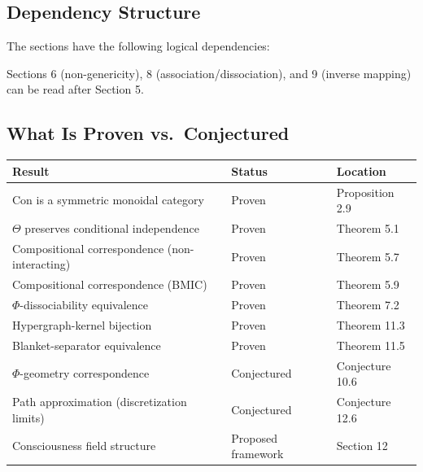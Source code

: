 \documentclass[11pt,a4paper]{article}
\theoremstyle{definition}
\theoremstyle{plain}
\theoremstyle{remark}
\begin{document}
\subsection*{Dependency Structure}

The sections have the following logical dependencies:
\begin{center}
\end{center}

Sections 6 (non-genericity), 8 (association/dissociation), and 9 (inverse mapping) can be read after Section 5.

\subsection*{What Is Proven vs.\ Conjectured}

\begin{center}
\begin{tabular}{lll}
\toprule
\textbf{Result} & \textbf{Status} & \textbf{Location} \\
\midrule
Con is a symmetric monoidal category & Proven & Proposition 2.9 \\
$\Theta$ preserves conditional independence & Proven & Theorem 5.1 \\
Compositional correspondence (non-interacting) & Proven & Theorem 5.7 \\
Compositional correspondence (BMIC) & Proven & Theorem 5.9 \\
$\Phi$-dissociability equivalence & Proven & Theorem 7.2 \\
Hypergraph-kernel bijection & Proven & Theorem 11.3 \\
Blanket-separator equivalence & Proven & Theorem 11.5 \\
\midrule
$\Phi$-geometry correspondence & Conjectured & Conjecture 10.6 \\
Path approximation (discretization limits) & Conjectured & Conjecture 12.6 \\
Consciousness field structure & Proposed framework & Section 12 \\
\bottomrule
\end{tabular}
\end{center}
\end{document}
